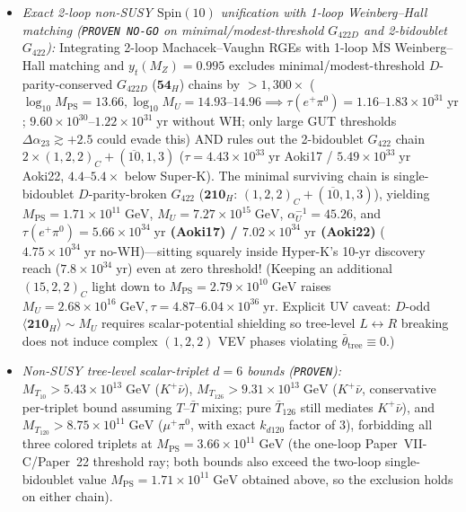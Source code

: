 \documentclass[11pt,a4paper]{article}
\begin{document}
\begin{enumerate}
\begin{itemize}
        \item \emph{Exact 2-loop non-SUSY $\mathrm{Spin}(10)$ unification with 1-loop Weinberg--Hall matching (\texttt{PROVEN NO-GO} on minimal/modest-threshold $G_{422D}$ and 2-bidoublet $G_{422}$):} Integrating 2-loop Machacek--Vaughn RGEs \cite{MachacekVaughn} with 1-loop $\overline{\mathrm{MS}}$ Weinberg--Hall matching and $y_t(M_Z)=0.995$ excludes minimal/modest-threshold $D$-parity-conserved $G_{422D}$ ($\mathbf{54}_H$) chains by $>1{,}300\times$ ($\log_{10} M_{\mathrm{PS}}=13.66, \log_{10} M_U=14.93\text{--}14.96 \implies \tau(e^+\pi^0)=1.16\text{--}1.83\times 10^{31}\;\mathrm{yr}$; $9.60\times 10^{30}\text{--}1.22\times 10^{31}\;\mathrm{yr}$ without WH; only large GUT thresholds $\Delta\alpha_{23}\gtrsim +2.5$ could evade this) AND rules out the 2-bidoublet $G_{422}$ chain $2\times(1,2,2)_C + (\overline{10},1,3)$ ($\tau = 4.43\times 10^{33}\;\mathrm{yr}$ Aoki17 / $5.49\times 10^{33}\;\mathrm{yr}$ Aoki22, $4.4\text{--}5.4\times$ below Super-K). The minimal surviving chain is single-bidoublet $D$-parity-broken $G_{422}$ ($\mathbf{210}_H$: $(1,2,2)_C + (\overline{10},1,3)$), yielding $M_{\mathrm{PS}}=1.71\times 10^{11}\;\mathrm{GeV}$, $M_U=7.27\times 10^{15}\;\mathrm{GeV}$, $\alpha_U^{-1}=45.26$, and \textbf{$\tau(e^+\pi^0)=5.66\times 10^{34}\;\mathrm{yr}$ (Aoki17) / $7.02\times 10^{34}\;\mathrm{yr}$ (Aoki22)} ($4.75\times 10^{34}\;\mathrm{yr}$ no-WH)---sitting squarely inside Hyper-K's 10-yr discovery reach ($7.8\times 10^{34}\;\mathrm{yr}$) even at zero threshold! (Keeping an additional $(15,2,2)_C$ light down to $M_{\mathrm{PS}}=2.79\times 10^{10}\;\mathrm{GeV}$ raises $M_U = 2.68\times 10^{16}\;\mathrm{GeV}, \tau = 4.87\text{--}6.04\times 10^{36}\;\mathrm{yr}$. Explicit UV caveat: $D$-odd $\langle\mathbf{210}_H\rangle\sim M_U$ requires scalar-potential shielding so tree-level $L\leftrightarrow R$ breaking does not induce complex $(1,2,2)$ VEV phases violating $\bar\theta_{\mathrm{tree}}\equiv 0$.)
        \item \emph{Non-SUSY tree-level scalar-triplet $d=6$ bounds (\texttt{PROVEN}):} $M_{T_{10}} > 5.43\times 10^{13}\;\mathrm{GeV}$ ($K^+\bar\nu$), $M_{T_{126}} > 9.31\times 10^{13}\;\mathrm{GeV}$ ($K^+\bar\nu$, conservative per-triplet bound assuming $T$--$\bar T$ mixing; pure $\bar T_{126}$ still mediates $K^+\bar\nu$), and $M_{T_{120}} > 8.75\times 10^{11}\;\mathrm{GeV}$ ($\mu^+\pi^0$, with exact $k_{d120}$ factor of $3$), forbidding all three colored triplets at $M_{\mathrm{PS}} = 3.66\times 10^{11}\;\mathrm{GeV}$ (the one-loop Paper~VII-C/Paper~22 threshold ray; both bounds also exceed the two-loop single-bidoublet value $M_{\mathrm{PS}} = 1.71\times 10^{11}\;\mathrm{GeV}$ obtained above, so the exclusion holds on either chain).

\end{itemize}
\end{enumerate}
\end{document}
